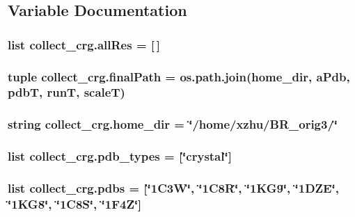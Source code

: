 \subsection{Variable Documentation}
\hypertarget{namespacecollect__crg_a6adec1fcbece2cff4950641eae68bcd3}{
\subsubsection[{all\-Res}]{\setlength{\rightskip}{0pt plus 5cm}list collect\-\_\-crg.\-all\-Res = \mbox{[}$\,$\mbox{]}}}\label{namespacecollect__crg_a6adec1fcbece2cff4950641eae68bcd3}
\hypertarget{namespacecollect__crg_adbbbb985f29cad69c52e5edafd43c3a1}{
\subsubsection[{final\-Path}]{\setlength{\rightskip}{0pt plus 5cm}tuple collect\-\_\-crg.\-final\-Path = os.\-path.\-join({\bf home\-\_\-dir}, a\-Pdb, pdb\-T, run\-T, scale\-T)}}\label{namespacecollect__crg_adbbbb985f29cad69c52e5edafd43c3a1}
\hypertarget{namespacecollect__crg_a012765d7486ed2b1666d1f35484e24b3}{
\subsubsection[{home\-\_\-dir}]{\setlength{\rightskip}{0pt plus 5cm}string collect\-\_\-crg.\-home\-\_\-dir = \char`\"{}/home/xzhu/B\-R\-\_\-orig3/\char`\"{}}}\label{namespacecollect__crg_a012765d7486ed2b1666d1f35484e24b3}
\hypertarget{namespacecollect__crg_a8127ffa599ed37f5f11b966b88cae94f}{
\subsubsection[{pdb\-\_\-types}]{\setlength{\rightskip}{0pt plus 5cm}list collect\-\_\-crg.\-pdb\-\_\-types = \mbox{[}\char`\"{}crystal\char`\"{}\mbox{]}}}\label{namespacecollect__crg_a8127ffa599ed37f5f11b966b88cae94f}
\hypertarget{namespacecollect__crg_acd1866df6be1616de51be9b2e7fcdd65}{
\subsubsection[{pdbs}]{\setlength{\rightskip}{0pt plus 5cm}list collect\-\_\-crg.\-pdbs = \mbox{[}\char`\"{}1\-C3\-W\char`\"{}, \char`\"{}1\-C8\-R\char`\"{}, \char`\"{}1\-K\-G9\char`\"{}, \char`\"{}1\-D\-Z\-E\char`\"{}, \char`\"{}1\-K\-G8\char`\"{}, \char`\"{}1\-C8\-S\char`\"{}, \char`\"{}1\-F4\-Z\char`\"{}\mbox{]}}}\label{namespacecollect__crg_acd1866df6be1616de51be9b2e7fcdd65}
